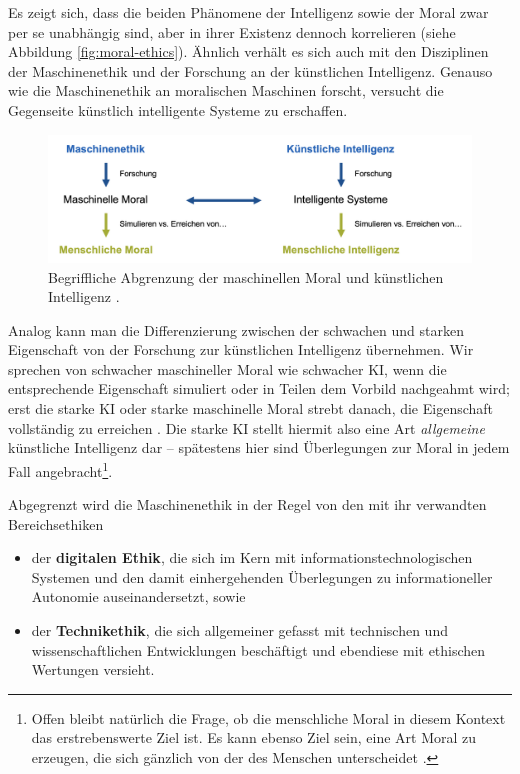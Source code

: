 \documentclass[twocolumn, german]{tum-article}
\begin{document}
Es zeigt sich, dass die beiden Phänomene der Intelligenz sowie der Moral zwar per se unabhängig sind, aber in ihrer Existenz dennoch korrelieren (siehe Abbildung \vref{fig:moral-ethics}). Ähnlich verhält es sich auch mit den Disziplinen der Maschinenethik und der Forschung an der künstlichen Intelligenz. Genauso wie die Maschinenethik an moralischen Maschinen forscht, versucht die Gegenseite künstlich intelligente Systeme zu erschaffen.

\begin{figure}
	\includegraphics[width=\textwidth]{media/eth-int}
	\caption{Begriffliche Abgrenzung der maschinellen Moral und künstlichen Intelligenz \cite[S. 17]{bendel-mascheth}.}
	\label{fig:moral-ethics}
\end{figure}

Analog kann man die Differenzierung zwischen der schwachen und starken Eigenschaft von der Forschung zur künstlichen Intelligenz übernehmen. Wir sprechen von schwacher maschineller Moral wie schwacher KI, wenn die entsprechende Eigenschaft simuliert oder in Teilen dem Vorbild nachgeahmt wird; erst die starke KI oder starke maschinelle Moral strebt danach, die Eigenschaft vollständig zu erreichen \cite[S. 17]{bendel-mascheth}. Die starke KI stellt hiermit also eine Art \emph{allgemeine} künstliche Intelligenz dar -- spätestens hier sind Überlegungen zur Moral in jedem Fall angebracht\footnote{Offen bleibt natürlich die Frage, ob die menschliche Moral in diesem Kontext das erstrebenswerte Ziel ist. Es kann ebenso Ziel sein, eine Art \glqq Moral\grqq{} zu erzeugen, die sich gänzlich von der des Menschen unterscheidet \cite[S. 23]{bendel-mascheth}.}.

Abgegrenzt wird die Maschinenethik in der Regel von den mit ihr verwandten Bereichsethiken
\begin{itemize}
	\item der \textbf{digitalen Ethik}, die sich im Kern mit informationstechnologischen Systemen und den damit einhergehenden Überlegungen zu informationeller Autonomie auseinandersetzt, sowie
	\item der \textbf{Technikethik}, die sich allgemeiner gefasst mit technischen und wissenschaftlichen Entwicklungen beschäftigt und ebendiese mit ethischen Wertungen versieht.
\end{itemize}
\end{document}
